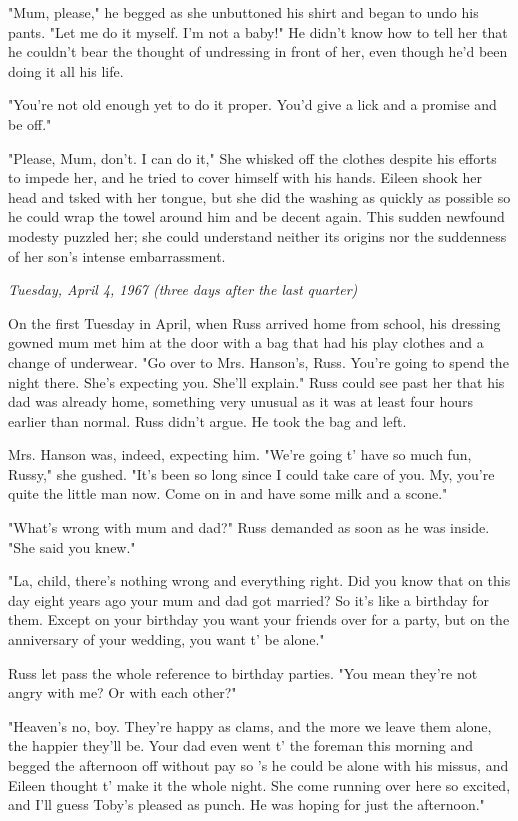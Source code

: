 \documentclass[a4paper,11pt]{article}
\begin{document}
"Mum, please," he begged as she unbuttoned his shirt and began to undo his pants. "Let me do it myself. I'm not a baby!" He didn't know how to tell her that he couldn't bear the thought of undressing in front of her, even though he'd been doing it all his life.

"You're not old enough yet to do it proper. You'd give a lick and a promise and be off."

"Please, Mum, don't. I can do it," She whisked off the clothes despite his efforts to impede her, and he tried to cover himself with his hands. Eileen shook her head and tsked with her tongue, but she did the washing as quickly as possible so he could wrap the towel around him and be decent again. This sudden newfound modesty puzzled her; she could understand neither its origins nor the suddenness of her son's intense embarrassment.

\emph{Tuesday, April 4, 1967 (three days after the last quarter)}

On the first Tuesday in April, when Russ arrived home from school, his dressing gowned mum met him at the door with a bag that had his play clothes and a change of underwear. "Go over to Mrs. Hanson's, Russ. You're going to spend the night there. She's expecting you. She'll explain." Russ could see past her that his dad was already home, something very unusual as it was at least four hours earlier than normal. Russ didn't argue. He took the bag and left.

Mrs. Hanson was, indeed, expecting him. "We're going t' have so much fun, Russy," she gushed. "It's been so long since I could take care of you. My, you're quite the little man now. Come on in and have some milk and a scone."

"What's wrong with mum and dad?" Russ demanded as soon as he was inside. "She said you knew."

"La, child, there's nothing wrong and everything right. Did you know that on this day eight years ago your mum and dad got married? So it's like a birthday for them. Except on your birthday you want your friends over for a party, but on the anniversary of your wedding, you want t' be alone."

Russ let pass the whole reference to birthday parties. "You mean they're not angry with me? Or with each other?"

"Heaven's no, boy. They're happy as clams, and the more we leave them alone, the happier they'll be. Your dad even went t' the foreman this morning and begged the afternoon off without pay so 's he could be alone with his missus, and Eileen thought t' make it the whole night. She come running over here so excited, and I'll guess Toby's pleased as punch. He was hoping for just the afternoon."
\end{document}
